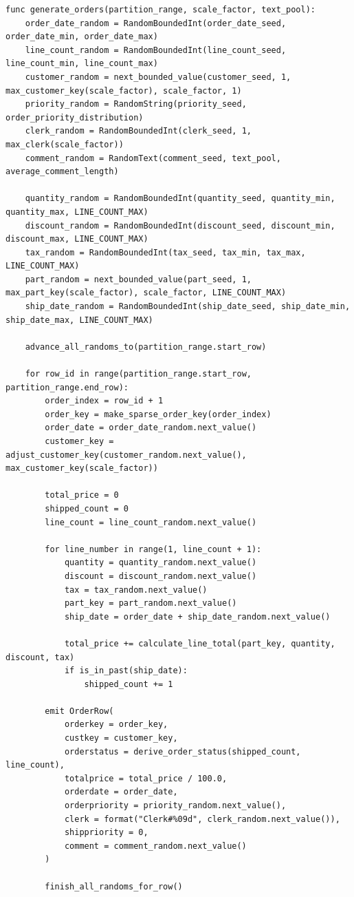 \begin{lstlisting}[caption={Формирование таблицы orders}]
func generate_orders(partition_range, scale_factor, text_pool):
    order_date_random = RandomBoundedInt(order_date_seed, order_date_min, order_date_max)
    line_count_random = RandomBoundedInt(line_count_seed, line_count_min, line_count_max)
    customer_random = next_bounded_value(customer_seed, 1, max_customer_key(scale_factor), scale_factor, 1)
    priority_random = RandomString(priority_seed, order_priority_distribution)
    clerk_random = RandomBoundedInt(clerk_seed, 1, max_clerk(scale_factor))
    comment_random = RandomText(comment_seed, text_pool, average_comment_length)

    quantity_random = RandomBoundedInt(quantity_seed, quantity_min, quantity_max, LINE_COUNT_MAX)
    discount_random = RandomBoundedInt(discount_seed, discount_min, discount_max, LINE_COUNT_MAX)
    tax_random = RandomBoundedInt(tax_seed, tax_min, tax_max, LINE_COUNT_MAX)
    part_random = next_bounded_value(part_seed, 1, max_part_key(scale_factor), scale_factor, LINE_COUNT_MAX)
    ship_date_random = RandomBoundedInt(ship_date_seed, ship_date_min, ship_date_max, LINE_COUNT_MAX)

    advance_all_randoms_to(partition_range.start_row)

    for row_id in range(partition_range.start_row, partition_range.end_row):
        order_index = row_id + 1
        order_key = make_sparse_order_key(order_index)
        order_date = order_date_random.next_value()
        customer_key = adjust_customer_key(customer_random.next_value(), max_customer_key(scale_factor))

        total_price = 0
        shipped_count = 0
        line_count = line_count_random.next_value()

        for line_number in range(1, line_count + 1):
            quantity = quantity_random.next_value()
            discount = discount_random.next_value()
            tax = tax_random.next_value()
            part_key = part_random.next_value()
            ship_date = order_date + ship_date_random.next_value()

            total_price += calculate_line_total(part_key, quantity, discount, tax)
            if is_in_past(ship_date):
                shipped_count += 1

        emit OrderRow(
            orderkey = order_key,
            custkey = customer_key,
            orderstatus = derive_order_status(shipped_count, line_count),
            totalprice = total_price / 100.0,
            orderdate = order_date,
            orderpriority = priority_random.next_value(),
            clerk = format("Clerk#%09d", clerk_random.next_value()),
            shippriority = 0,
            comment = comment_random.next_value()
        )

        finish_all_randoms_for_row()
\end{lstlisting}


